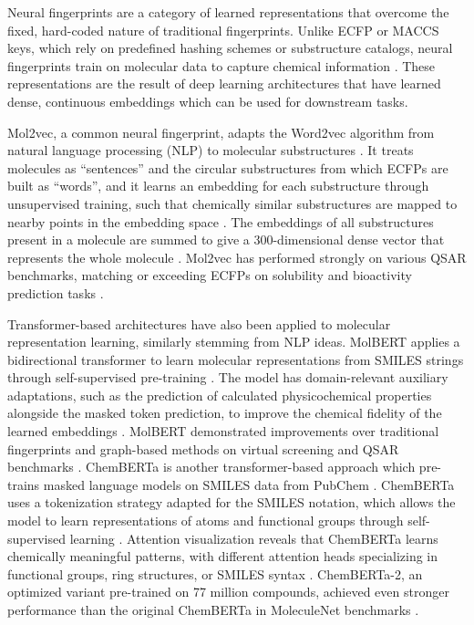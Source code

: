 Neural fingerprints are a category of learned  representations that overcome the fixed, hard-coded nature of traditional fingerprints. Unlike ECFP or MACCS keys, which rely on predefined hashing schemes or substructure catalogs, neural fingerprints train on molecular data to capture chemical information \citep{Jaeger2018, Chithrananda2020}. These representations are the result of deep learning architectures that have learned dense, continuous embeddings which can be used for downstream tasks. 

Mol2vec, a common neural fingerprint, adapts the Word2vec algorithm from natural language processing (NLP) to molecular substructures \citep{Jaeger2018}. It treats molecules as ``sentences'' and the circular substructures from which ECFPs are built as ``words'', and it learns an embedding for each substructure through unsupervised training, such that chemically similar substructures are mapped to nearby points in the embedding space \citep{Jaeger2018}. The embeddings of all substructures present in a molecule are summed to give a 300-dimensional dense vector that represents the whole molecule \citep{Jaeger2018}. Mol2vec has performed strongly on various QSAR benchmarks, matching or exceeding ECFPs on solubility and bioactivity prediction tasks \citep{Jaeger2018}.

Transformer-based architectures have also been applied to molecular representation learning, similarly stemming from NLP ideas. MolBERT applies a bidirectional transformer to learn molecular representations from SMILES strings through self-supervised pre-training \citep{Fabian2020}. The model has domain-relevant auxiliary adaptations, such as the prediction of calculated physicochemical properties alongside the masked token prediction, to improve the chemical fidelity of the learned embeddings \citep{Fabian2020}. MolBERT demonstrated improvements over traditional fingerprints and graph-based methods on virtual screening and QSAR benchmarks \citep{Fabian2020}. ChemBERTa is another transformer-based approach which pre-trains masked language models on SMILES data from PubChem \citep{Chithrananda2020}.  ChemBERTa uses a tokenization strategy adapted for the SMILES notation, which allows the model to learn representations of atoms and functional groups through self-supervised learning \citep{Chithrananda2020}. Attention visualization reveals that ChemBERTa learns chemically meaningful patterns, with different attention heads specializing in functional groups, ring structures, or SMILES syntax \citep{Chithrananda2020}. ChemBERTa-2, an optimized variant pre-trained on 77 million compounds, achieved even stronger performance than the original ChemBERTa in MoleculeNet benchmarks \citep{Ahmad2022}.

